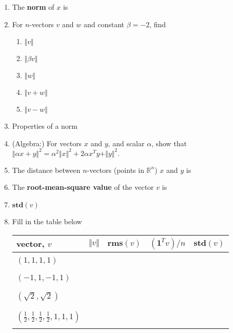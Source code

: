 \documentclass[11pt,fleqn]{article}
\begin{document}
\renewcommand{\headrulewidth}{0pt}
\newcommand{\blank}[1]{\rule{#1}{0.75pt}}
\renewcommand{\d}{\displaystyle}
\vspace*{-0.7in}
\begin{center}
  \large {}
\end{center}
\begin{enumerate}
\item  The \textbf{norm} of $x$ is

\vfill

\item For $n$-vectors $v$ and $w$ and constant $\beta=-2$, find
	\begin{enumerate}
	\item $\Vert v \Vert$
	\vfill
	\item $\Vert \beta v \Vert$
	\vfill
	\item $\Vert w \Vert$
	\vfill
	\item $\Vert v+w \Vert$
	\vfill
	\item $ \Vert v-w \Vert$
	\vfill
	\end{enumerate}
\item Properties of a norm
\vspace{2in}
\newpage
\item (Algebra:) For vectors $x$ and $y$, and scalar $\alpha$, show that $\Vert \alpha x + y \Vert^2= \alpha^2 \Vert x \Vert^2 + 2 \alpha x^Ty + \Vert y \Vert^2.$
\vspace{1.8in}

\item The distance between $n$-vectors (points in $\mathbb{R}^n$) $x$ and $y$ is
\vfill

\item The \textbf{root-mean-square value} of the vector $v$ is

\vfill

\item $\textbf{std}(v)$

\vfill


\item Fill in the table below


\begin{tabularx}{\textwidth}{X|X|X|X|X}
vector, $v$&$\Vert v \Vert$&  $\textbf{rms}(v)$&$(\textbf{1}^Tv)/n$&$\textbf{std}(v)$\\
\hline
&&&&\\
$(1,1,1,1)$&&&&\\
&&&&\\
\hline
&&&&\\
$(-1,1,-1,1)$&&&&\\
&&&&\\
\hline
&&&&\\
$(\sqrt{2},\sqrt{2})$&&&&\\
&&&&\\
\hline
&&&&\\
$(\frac{1}{2},\frac{1}{2},\frac{1}{2},\frac{1}{2},1,1,1)$&&&&\\
&&&&\\
\hline
\end{tabularx}
\end{enumerate}
\end{document}

